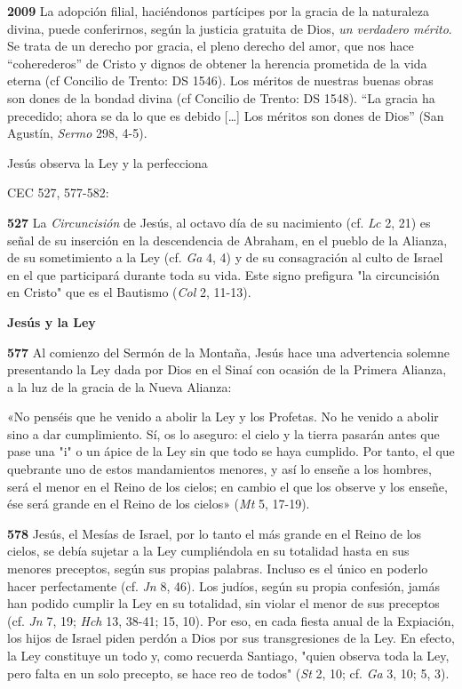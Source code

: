 \documentclass[]{article}
\begin{document}
\textbf{2009} La adopción filial, haciéndonos partícipes por la gracia
de la naturaleza divina, puede conferirnos, según la justicia gratuita
de Dios, \emph{un verdadero mérito}. Se trata de un derecho por gracia,
el pleno derecho del amor, que nos hace ``coherederos'' de Cristo y
dignos de obtener la herencia prometida de la vida eterna (cf Concilio
de Trento: DS 1546). Los méritos de nuestras buenas obras son dones de
la bondad divina (cf Concilio de Trento: DS 1548). ``La gracia ha
precedido; ahora se da lo que es debido [\ldots{}] Los méritos son dones
de Dios'' (San Agustín, \emph{Sermo} 298, 4-5).

Jesús observa la Ley y la perfecciona

 CEC 527, 577-582:

\textbf{527} La \emph{Circuncisión} de Jesús, al octavo día de su
nacimiento (cf. \emph{Lc} 2, 21) es señal de su inserción en la
descendencia de Abraham, en el pueblo de la Alianza, de su sometimiento
a la Ley (cf. \emph{Ga} 4, 4) y de su consagración al culto de Israel en
el que participará durante toda su vida. Este signo prefigura "la
circuncisión en Cristo" que es el Bautismo (\emph{Col} 2, 11-13).

\textbf{Jesús y la Ley}

\textbf{577} Al comienzo del Sermón de la Montaña, Jesús hace una
advertencia solemne presentando la Ley dada por Dios en el Sinaí con
ocasión de la Primera Alianza, a la luz de la gracia de la Nueva
Alianza:

«No penséis que he venido a abolir la Ley y los Profetas. No he venido a
abolir sino a dar cumplimiento. Sí, os lo aseguro: el cielo y la tierra
pasarán antes que pase una "i" o un ápice de la Ley sin que todo se haya
cumplido. Por tanto, el que quebrante uno de estos mandamientos menores,
y así lo enseñe a los hombres, será el menor en el Reino de los cielos;
en cambio el que los observe y los enseñe, ése será grande en el Reino
de los cielos» (\emph{Mt} 5, 17-19).

\textbf{578} Jesús, el Mesías de Israel, por lo tanto el más grande en
el Reino de los cielos, se debía sujetar a la Ley cumpliéndola en su
totalidad hasta en sus menores preceptos, según sus propias palabras.
Incluso es el único en poderlo hacer perfectamente (cf. \emph{Jn} 8,
46). Los judíos, según su propia confesión, jamás han podido cumplir la
Ley en su totalidad, sin violar el menor de sus preceptos (cf. \emph{Jn}
7, 19; \emph{Hch} 13, 38-41; 15, 10). Por eso, en cada fiesta anual de
la Expiación, los hijos de Israel piden perdón a Dios por sus
transgresiones de la Ley. En efecto, la Ley constituye un todo y, como
recuerda Santiago, "quien observa toda la Ley, pero falta en un solo
precepto, se hace reo de todos" (\emph{St} 2, 10; cf. \emph{Ga} 3, 10;
5, 3).
\end{document}
